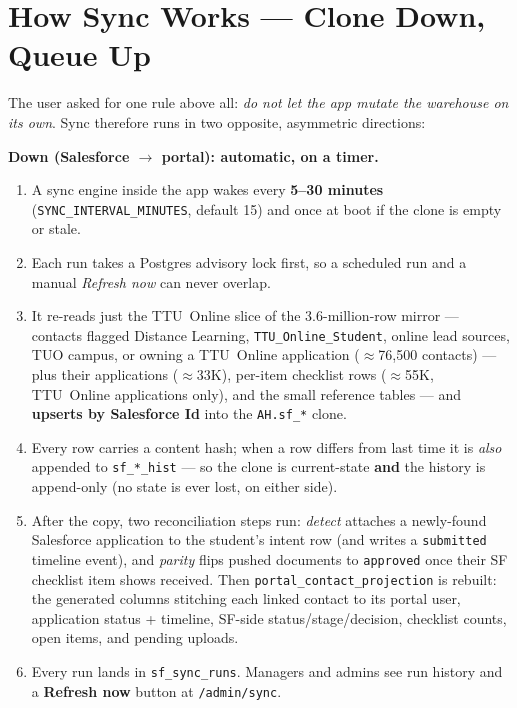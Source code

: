 \documentclass[11pt,letterpaper]{report}
\begin{document}
\section{How Sync Works --- Clone Down, Queue Up}

The user asked for one rule above all: \emph{do not let the app mutate the
warehouse on its own}. Sync therefore runs in two opposite, asymmetric
directions:

\textbf{Down (Salesforce $\rightarrow$ portal): automatic, on a timer.}
\begin{enumerate}[leftmargin=1.6em]
  \item A sync engine inside the app wakes every \textbf{5--30 minutes}
        (\texttt{SYNC\_INTERVAL\_MINUTES}, default 15) and once at boot if the
        clone is empty or stale.
  \item Each run takes a Postgres advisory lock first, so a scheduled run and a
        manual \emph{Refresh now} can never overlap.
  \item It re-reads just the TTU~Online slice of the 3.6-million-row mirror ---
        contacts flagged Distance Learning, \texttt{TTU\_Online\_Student},
        online lead sources, TUO campus, or owning a TTU~Online application
        ($\approx$76{,}500 contacts) --- plus their applications ($\approx$33K),
        per-item checklist rows ($\approx$55K, TTU~Online applications only),
        and the small reference tables --- and \textbf{upserts by Salesforce Id}
        into the \texttt{AH.sf\_*} clone.
  \item Every row carries a content hash; when a row differs from last time it
        is \emph{also} appended to \texttt{sf\_*\_hist} --- so the clone is
        current-state \textbf{and} the history is append-only (no state is
        ever lost, on either side).
  \item After the copy, two reconciliation steps run: \emph{detect} attaches a
        newly-found Salesforce application to the student's intent row (and
        writes a \texttt{submitted} timeline event), and \emph{parity} flips
        pushed documents to \texttt{approved} once their SF checklist item
        shows received. Then \texttt{portal\_contact\_projection} is rebuilt:
        the generated columns stitching each linked contact to its portal user,
        application status + timeline, SF-side status/stage/decision, checklist
        counts, open items, and pending uploads.
  \item Every run lands in \texttt{sf\_sync\_runs}. Managers and admins see
        run history and a \textbf{Refresh now} button at \texttt{/admin/sync}.
\end{enumerate}
\end{document}
